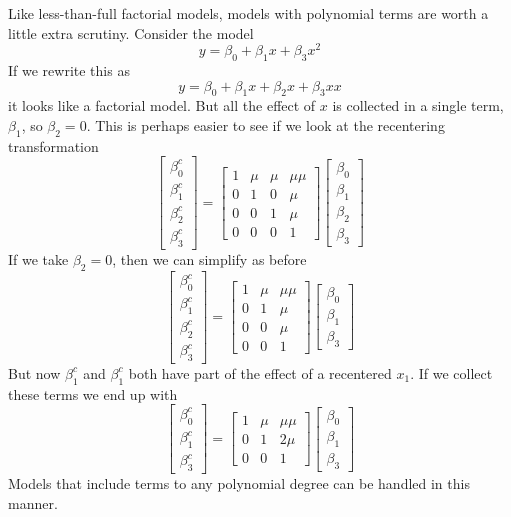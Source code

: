 \documentclass[]{article}
\begin{document}
Like less-than-full factorial models, models with polynomial terms are
worth a little extra scrutiny. Consider the model
\[y = \beta_0 + \beta_1x + \beta_3x^2\] If we rewrite this as
\[y = \beta_0 + \beta_1x + \beta_2x +\beta_3xx\] it looks like a
factorial model. But all the effect of \(x\) is collected in a single
term, \(\beta_1\), so \(\beta_2=0\). This is perhaps easier to see if we
look at the recentering transformation
\[\begin{bmatrix}\beta_0^c \\ \beta_1^c \\ \beta_2^c \\ \beta_3^c \end{bmatrix}=
\begin{bmatrix} 1 & \mu &\mu &\mu\mu \\
  0 &1 &0 &\mu \\ 0 &0 &1 &\mu \\ 0 &0 &0 &1 \end{bmatrix}
\begin{bmatrix}\beta_0 \\ \beta_1 \\ \beta_2 \\ \beta_3  \end{bmatrix}\]
If we take \(\beta_2=0\), then we can simplify as before
\[\begin{bmatrix}\beta_0^c \\ \beta_1^c \\ \beta_2^c \\ \beta_3^c \end{bmatrix}=
\begin{bmatrix} 1 & \mu &\mu\mu \\
  0 &1 &\mu \\ 0 &0 &\mu \\ 0 &0 &1 \end{bmatrix}
\begin{bmatrix}\beta_0 \\ \beta_1 \\ \beta_3  \end{bmatrix}\] But now
\(\beta_1^c\) and \(\beta_1^c\) both have part of the effect of a
recentered \(x_1\). If we collect these terms we end up with
\[\begin{bmatrix}\beta_0^c \\ \beta_1^c \\ \beta_3^c \end{bmatrix}=
\begin{bmatrix} 1 & \mu &\mu\mu \\
  0 &1 &2\mu \\ 0 &0 &1 \end{bmatrix}
\begin{bmatrix}\beta_0 \\ \beta_1 \\ \beta_3  \end{bmatrix}\] Models
that include terms to any polynomial degree can be handled in this
manner.
\end{document}
